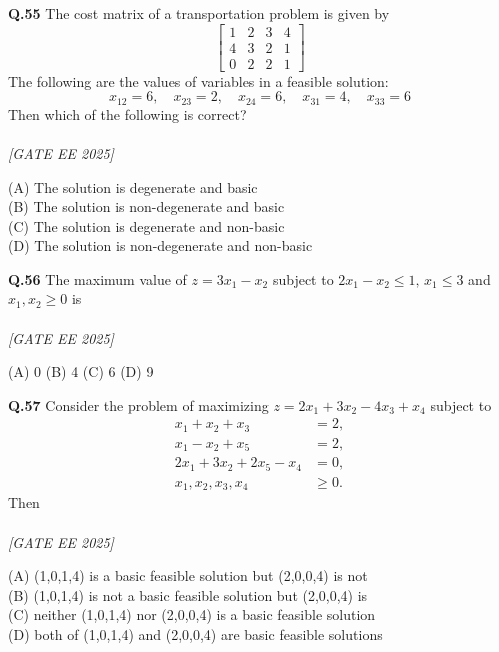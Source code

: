 \documentclass[11pt]{article}
\begin{document}
\begin{flushleft}
\textbf{Q.55} The cost matrix of a transportation problem is given by
\[
\begin{bmatrix}
1 & 2 & 3 & 4 \\
4 & 3 & 2 & 1 \\
0 & 2 & 2 & 1
\end{bmatrix}
\]
The following are the values of variables in a feasible solution:
\[
x_{12} = 6, \quad x_{23} = 2, \quad x_{24} = 6, \quad x_{31} = 4, \quad x_{33} = 6
\]
Then which of the following is correct? \\
\\[1ex] \textit{[GATE EE 2025]}

(A) The solution is degenerate and basic \\
(B) The solution is non-degenerate and basic \\
(C) The solution is degenerate and non-basic \\
(D) The solution is non-degenerate and non-basic
\end{flushleft}

\begin{flushleft}
\textbf{Q.56} The maximum value of $z = 3x_1 - x_2$ subject to $2x_1 - x_2 \leq 1, \, x_1 \leq 3$ and $x_1, x_2 \geq 0$ is \\
\\[1ex] \textit{[GATE EE 2025]}


(A) 0 \hspace{2em} (B) 4 \hspace{2em} (C) 6 \hspace{2em} (D) 9
\end{flushleft}

\begin{flushleft}
\textbf{Q.57} Consider the problem of maximizing $z = 2x_1 + 3x_2 - 4x_3 + x_4$ subject to
\[
\begin{aligned}
x_1 + x_2 + x_3 &= 2, \\
x_1 - x_2 + x_5 &= 2, \\
2x_1 + 3x_2 + 2x_5 - x_4 &= 0, \\
x_1, x_2, x_3, x_4 &\geq 0.
\end{aligned}
\]
Then \\
\\[1ex] \textit{[GATE EE 2025]}


(A) (1,0,1,4) is a basic feasible solution but (2,0,0,4) is not \\
(B) (1,0,1,4) is not a basic feasible solution but (2,0,0,4) is \\
(C) neither (1,0,1,4) nor (2,0,0,4) is a basic feasible solution \\
(D) both of (1,0,1,4) and (2,0,0,4) are basic feasible solutions
\end{flushleft}
\end{document}
